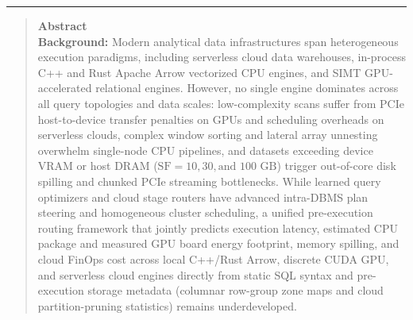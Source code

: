 \documentclass[10pt,a4paper]{article}
\begin{document}
\noindent\rule{\textwidth}{0.8pt}
\begin{quote}
\small\sffamily
\textbf{\color{springerblue}Abstract}\\[0.3em]
\textbf{Background:} Modern analytical data infrastructures span heterogeneous execution paradigms, including serverless cloud data warehouses, in-process C++ and Rust Apache Arrow vectorized CPU engines, and SIMT GPU-accelerated relational engines. However, no single engine dominates across all query topologies and data scales: low-complexity scans suffer from PCIe host-to-device transfer penalties on GPUs and scheduling overheads on serverless clouds, complex window sorting and lateral array unnesting overwhelm single-node CPU pipelines, and datasets exceeding device VRAM or host DRAM ($\text{SF}=10, 30, \text{and } 100\text{ GB}$) trigger out-of-core disk spilling and chunked PCIe streaming bottlenecks. While learned query optimizers and cloud stage routers have advanced intra-DBMS plan steering and homogeneous cluster scheduling, a unified pre-execution routing framework that jointly predicts execution latency, estimated CPU package and measured GPU board energy footprint, memory spilling, and cloud FinOps cost across local C++/Rust Arrow, discrete CUDA GPU, and serverless cloud engines directly from static SQL syntax and pre-execution storage metadata (columnar row-group zone maps and cloud partition-pruning statistics) remains underdeveloped.\\[0.25em]

\end{quote}
\end{document}
